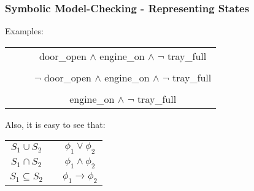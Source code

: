 \begin{frame}
  \frametitle{Symbolic Model-Checking - Representing States}

  \scriptsize

  Examples:
  \medskip\\
  \begin{tabular}{ccc}

    \begin{minipage}{.4\textwidth}
      
    \end{minipage}
    &~ &
    door\_open $\wedge$ engine\_on $\wedge$ $\neg$ tray\_full \\
    \pause
    \\

    \begin{minipage}{.4\textwidth}
      
    \end{minipage}
    &~ &
    $\neg$ door\_open $\wedge$ engine\_on $\wedge$ $\neg$ tray\_full \\
    \pause
    \\

    \begin{minipage}{.4\textwidth}
      
    \end{minipage}
    &~ &
    engine\_on $\wedge$ $\neg$ tray\_full \\

  \end{tabular}
  \vfill\pause
  Also, it is easy to see that:
  \medskip\\
  \begin{tabular}{ccc}
    $S_1 \cup S_2$ & & $\phi_1 \vee \phi_2$ \\
    $S_1 \cap S_2$ & & $\phi_1 \wedge \phi_2$ \\
    $S_1 \subseteq S_2$ & & $\phi_1 \rightarrow \phi_2$ 
  \end{tabular}

\end{frame}

